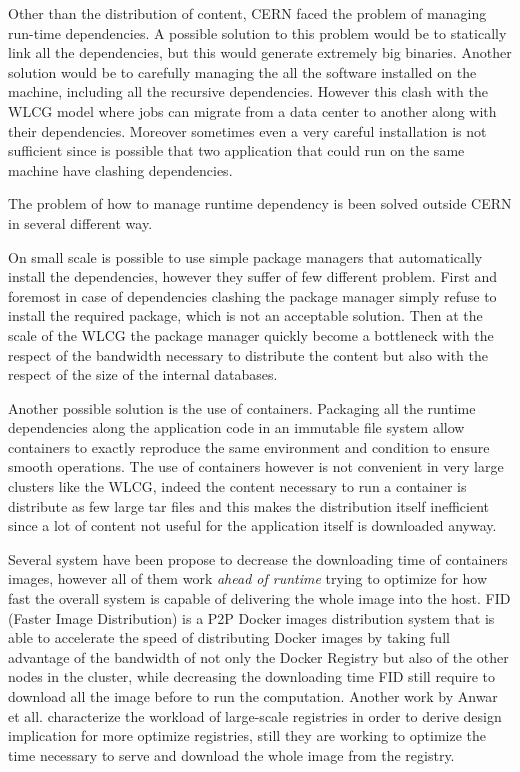 Other than the distribution of content, CERN faced the problem of managing
run-time dependencies. A possible solution to this problem would be to
statically link all the dependencies, but this would generate extremely big
binaries.  Another solution would be to carefully managing the all the software
installed on the machine, including all the recursive dependencies. However this
clash with the WLCG model where jobs can migrate from a data center to another
along with their dependencies.  Moreover sometimes even a very careful
installation is not sufficient since is possible that two application that
could run on the same machine have clashing dependencies.

The problem of how to manage runtime dependency is been solved outside CERN in
several different way.

On small scale is possible to use simple package managers that automatically
install the dependencies, however they suffer of few different problem. First
and foremost in case of dependencies clashing the package manager simply refuse
to install the required package, which is not an acceptable solution. Then at
the scale of the WLCG the package manager quickly become a bottleneck with the
respect of the bandwidth necessary to distribute the content but also with the
respect of the size of the internal databases.

Another possible solution is the use of containers. Packaging all the runtime
dependencies along the application code in an immutable file system allow
containers to exactly reproduce the same environment and condition to ensure
smooth operations. The use of containers however is not convenient in very
large clusters like the WLCG, indeed the content necessary to run a container
is distribute as few large tar files and this makes the distribution itself
inefficient since a lot of content not useful for the application itself is
downloaded anyway. 

Several system have been propose to decrease the downloading time of containers
images, however all of them work \textit{ahead of runtime} trying to optimize
for how fast the overall system is capable of delivering the whole image into
the host. FID (Faster Image Distribution) \cite{FID} is a P2P Docker images
distribution system that is able to accelerate the speed of distributing Docker
images by taking full advantage of the bandwidth of not only the Docker
Registry but also of the other nodes in the cluster, while decreasing the
downloading time FID still require to download all the image before to run the
computation. Another work by Anwar et all. \cite{210500} characterize the
workload of large-scale registries in order to derive design implication for
more optimize registries, still they are working to optimize the time necessary
to serve and download the whole image from the registry.


